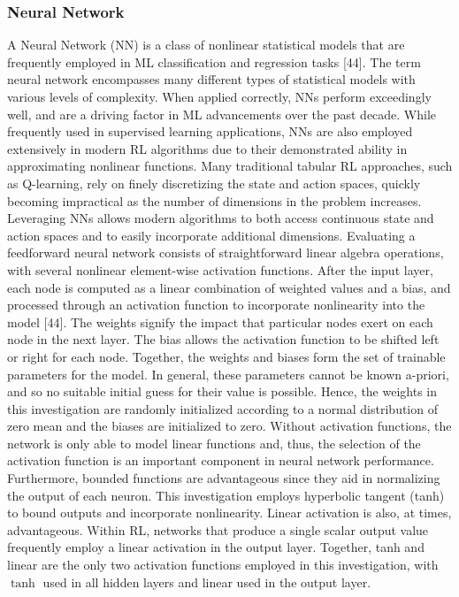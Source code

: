 \documentclass[conference]{IEEEtran}
\begin{document}
\subsubsection{Neural Network}
A Neural Network (NN) is a class of nonlinear statistical models that are frequently employed in ML classification and regression tasks [44]. The term neural network encompasses many different types of statistical models with various levels of complexity. When applied correctly, NNs perform exceedingly well, and are a driving factor in ML advancements over the past decade. While frequently used in supervised learning applications, NNs are also employed extensively in modern RL algorithms due to their demonstrated ability in approximating nonlinear functions. Many traditional tabular RL approaches, such as Q-learning, rely on finely discretizing the state and action spaces, quickly becoming impractical as the number of dimensions in the problem increases. Leveraging NNs allows modern algorithms to both access continuous state and action spaces and to easily incorporate additional dimensions.
Evaluating a feedforward neural network consists of straightforward linear algebra operations, with several nonlinear element-wise activation functions. After the input layer, each node is computed as a linear combination of weighted values and a bias, and processed through an activation function to incorporate nonlinearity into the model [44]. The weights signify the impact that particular nodes exert on each node in the next layer. The bias allows the activation function to be shifted left or right for each node. Together, the weights and biases form the set of trainable parameters for the model. In general, these parameters cannot be known a-priori, and so no suitable initial guess for their value is possible. Hence, the weights in this investigation are randomly initialized according to a normal distribution of zero mean and the biases are initialized to zero.
Without activation functions, the network is only able to model linear functions and, thus, the selection of the activation function is an important component in neural network performance. Furthermore, bounded functions are advantageous since they aid in normalizing the output of each neuron. This investigation employs hyperbolic tangent (tanh) to bound outputs and incorporate nonlinearity. Linear activation is also, at times, advantageous. Within RL, networks that produce a single scalar output value frequently employ a linear activation in the output layer. Together, tanh and linear are the only two activation functions employed in this investigation, with \(\tanh\) used in all hidden layers and linear used in the output layer.
\end{document}

